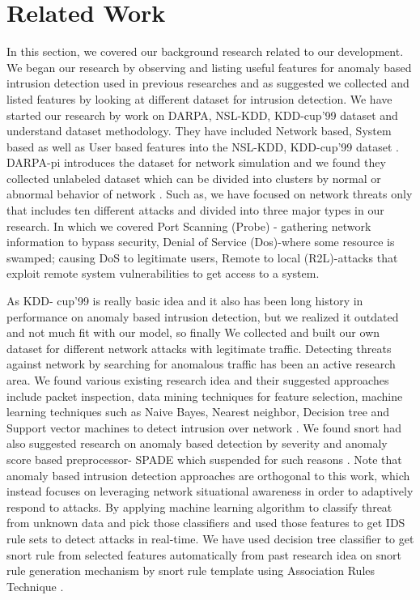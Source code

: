 \section{Related Work}
\label{related}

In this section, we covered our background research related to our development. We began our research by observing and listing useful features for anomaly based intrusion detection used in previous researches and as suggested we collected and listed features by looking at different dataset for intrusion detection. We have started our research by work on DARPA, NSL-KDD, KDD-cup'99 dataset and understand dataset methodology. They have included Network based, System based as well as User based features into the NSL-KDD, KDD-cup'99 dataset \cite{AnalysisofNetfeatures}. DARPA-pi introduces the dataset for network simulation and we found they collected unlabeled dataset which can be divided into clusters by normal or abnormal behavior of network \cite{DARPAdataset,NeuralNetBase}. Such as, we have focused on network threats only that includes ten different attacks and divided into three major types in our research. In which we covered Port Scanning (Probe) - gathering network information to bypass security, Denial of Service (Dos)-where some resource is swamped; causing DoS to legitimate users, Remote to local (R2L)-attacks that exploit remote system vulnerabilities to get access to a system\cite{R2L}. 

As KDD- cup'99 is really basic idea and it also has been long history in performance on anomaly based intrusion detection, but we realized it outdated and not much fit with our model, so finally We collected and built our own dataset for different network attacks with legitimate traffic. Detecting threats against network by searching for anomalous traffic has been an active research area. We found various existing research idea and their suggested approaches include packet inspection, data mining techniques for feature selection, machine learning techniques such as Naive Bayes, Nearest neighbor, Decision tree and Support vector machines to detect intrusion over network \cite{DMnIDS}. We found snort had also suggested research on anomaly based detection by severity and anomaly score based preprocessor- SPADE which suspended for such reasons \cite{SPADE}. Note that anomaly based intrusion detection approaches are orthogonal to this work, which instead focuses on leveraging network situational awareness in order to adaptively respond to attacks. By applying machine learning algorithm to classify threat from unknown data and pick those classifiers and used those features to get IDS rule sets to detect attacks in real-time. We have used decision tree classifier to get snort rule from selected features automatically from past research idea on snort rule generation mechanism by snort rule template using Association Rules Technique \cite{NetData2ARFF, misc:weka.jar}. 

